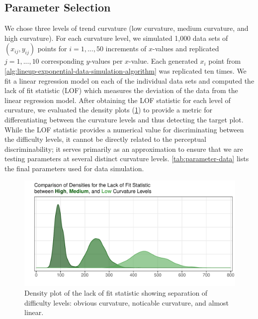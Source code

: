 \documentclass[12pt]{article}
\begin{document}
\hypertarget{lineups-parameter-selection}{%
\subsection{Parameter Selection}\label{lineups-parameter-selection}}

We chose three levels of trend curvature (low curvature, medium
curvature, and high curvature). For each curvature level, we simulated
1,000 data sets of \((x_{ij}, y_{ij})\) points for \(i = 1,...,50\)
increments of \(x\)-values and replicated \(j = 1,...,10\) corresponding
\(y\)-values per \(x\)-value. Each generated \(x_i\) point from
\cref{alg:lineup-exponential-data-simulation-algorithm} was replicated
ten times. We fit a linear regression model on each of the individual
data sets and computed the lack of fit statistic (LOF) which measures
the deviation of the data from the linear regression model. After
obtaining the LOF statistic for each level of curvature, we evaluated
the density plots (\cref{fig:lof-density-curves}) to provide a metric
for differentiating between the curvature levels and thus detecting the
target plot. While the LOF statistic provides a numerical value for
discriminating between the difficulty levels, it cannot be directly
related to the perceptual discriminability; it serves primarily as an
approximation to ensure that we are testing parameters at several
distinct curvature levels. \cref{tab:parameter-data} lists the final
parameters used for data simulation.

\begin{figure}[tbp]

{\centering \includegraphics[width=1\linewidth,]{logarithmic-lineups-revisions_files/figure-latex/lof-density-curves-1} 

}

\caption[Lineup parameter selection]{Density plot of the lack of fit statistic showing separation of difficulty levels: obvious curvature, noticable curvature, and almost linear.}\label{fig:lof-density-curves}
\end{figure}
\end{document}
